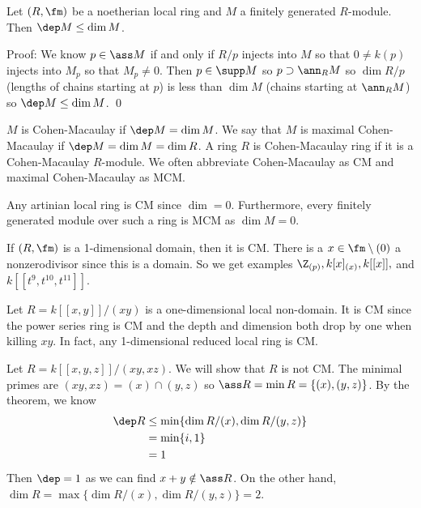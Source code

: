 \begin{cor}
Let $(R,\fm)$ be a noetherian local ring and $M$ a finitely generated $R$-module. Then $\dep M \leq \dim M$.
\end{cor}

\noindent Proof: We know $p \in \ass M$ if and only if $R/p$ injects into $M$ so that $0\neq k(p)$ injects into $M_p$ so that $M_p \neq 0$. Then $p \in \supp M$ so $p \supset \ann_R M$ so $\dim R/p$ (lengths of chains starting at $p$) is less than $\dim M$ (chains starting at $\ann_R M$) so $\dep M \leq \dim M$. \qed \\

\begin{dfn}
$M$ is Cohen-Macaulay if $\dep M=\dim M$. We say that $M$ is maximal Cohen-Macaulay if $\dep M=\dim M=\dim R$. A ring $R$ is Cohen-Macaulay ring if it is a Cohen-Macaulay $R$-module. We often abbreviate Cohen-Macaulay as CM and maximal Cohen-Macaulay as MCM.
\end{dfn}

\begin{ex}
Any artinian local ring is CM since $\dim =0$. Furthermore, every finitely generated module over such a ring is MCM as $\dim M=0$. 
\end{ex}

\begin{ex}
If $(R,\fm)$ is a 1-dimensional domain, then it is CM. There is a $x \in \fm \setminus (0)$ a nonzerodivisor since this is a domain. So we get examples $\Z_{(p)}, k[x]_{(x)}, k[[x]], $ and $k[[t^9,t^{10},t^{11}]]$. 
\end{ex}

\begin{ex}
Let $R=k[[x,y]]/(xy)$ is a one-dimensional local non-domain. It is CM since the power series ring is CM and the depth and dimension both drop by one when killing $xy$. In fact, any 1-dimensional reduced local ring is CM.
\end{ex}

\begin{ex}
Let $R=k[[x,y,z]]/(xy,xz)$. We will show that $R$ is not CM. The minimal primes are $(xy,xz)=(x) \cap (y,z)$ so $\ass R=\min R=\{(x),(y,z)\}$. By the theorem, we know
\[
\begin{split}
\dep R &\leq \min\{\dim R/(x),\dim R/(y,z)\} \\
&= \min\{i,1\} \\
&=1
\end{split}
\]
Then $\dep=1$ as we can find $x+y \notin \ass R$. On the other hand, $\dim R=\max\{\dim R/(x),\dim R/(y,z)\}=2$.
\end{ex}

